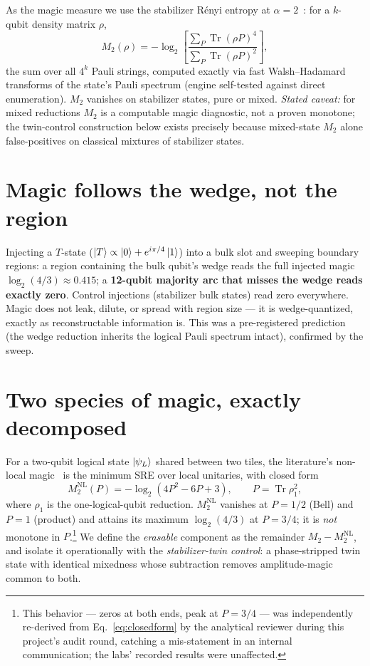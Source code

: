 \documentclass[11pt]{article}
\newcommand{\Mtwo}{M_2}
\newcommand{\NL}{\Mtwo^{\mathrm{NL}}}
\begin{document}
As the magic measure we use the stabilizer R\'enyi entropy at
$\alpha=2$~\cite{leone}: for a $k$-qubit density matrix $\rho$,
\begin{equation}
  \Mtwo(\rho) = -\log_2\!\left[\frac{\sum_P \operatorname{Tr}(\rho P)^4}
  {\sum_P \operatorname{Tr}(\rho P)^2}\right],
\end{equation}
the sum over all $4^k$ Pauli strings, computed exactly via fast
Walsh--Hadamard transforms of the state's Pauli spectrum (engine self-tested
against direct enumeration). $\Mtwo$ vanishes on stabilizer states, pure or
mixed. \emph{Stated caveat:} for mixed reductions $\Mtwo$ is a computable magic
diagnostic, not a proven monotone; the twin-control construction below exists
precisely because mixed-state $\Mtwo$ alone false-positives on classical
mixtures of stabilizer states.

\section{Magic follows the wedge, not the region}

Injecting a $T$-state ($\ket{T}\propto\ket{0}+e^{i\pi/4}\ket{1}$) into a bulk
slot and sweeping boundary regions:
a region containing the bulk qubit's wedge reads the full injected magic
$\log_2(4/3)\approx0.415$; a \textbf{12-qubit majority arc that misses the
wedge reads exactly zero}. Control injections (stabilizer bulk states) read
zero everywhere. Magic does not leak, dilute, or spread with region size --- it
is wedge-quantized, exactly as reconstructable information is. This was a
pre-registered prediction (the wedge reduction inherits the logical Pauli
spectrum intact), confirmed by the sweep.

\section{Two species of magic, exactly decomposed}

For a two-qubit logical state $\ket{\psi_L}$ shared between two tiles, the
literature's non-local magic~\cite{nlexp} is the minimum SRE over local
unitaries, with closed form
\begin{equation}
  \NL(P) = -\log_2\!\left(4P^2 - 6P + 3\right),
  \qquad P = \operatorname{Tr}\rho_1^2,
  \label{eq:closedform}
\end{equation}
where $\rho_1$ is the one-logical-qubit reduction. $\NL$ vanishes at $P=1/2$
(Bell) and $P=1$ (product) and attains its maximum $\log_2(4/3)$ at $P=3/4$; it
is \emph{not} monotone in $P$.\footnote{This behavior --- zeros at both ends,
peak at $P=3/4$ --- was independently re-derived from
Eq.~\eqref{eq:closedform} by the analytical reviewer during this project's
audit round, catching a mis-statement in an internal communication; the labs'
recorded results were unaffected.} We define the \emph{erasable} component as
the remainder $\Mtwo-\NL$, and isolate it operationally with the
\emph{stabilizer-twin control}: a phase-stripped twin state with identical
mixedness whose subtraction removes amplitude-magic common to both.
\end{document}
